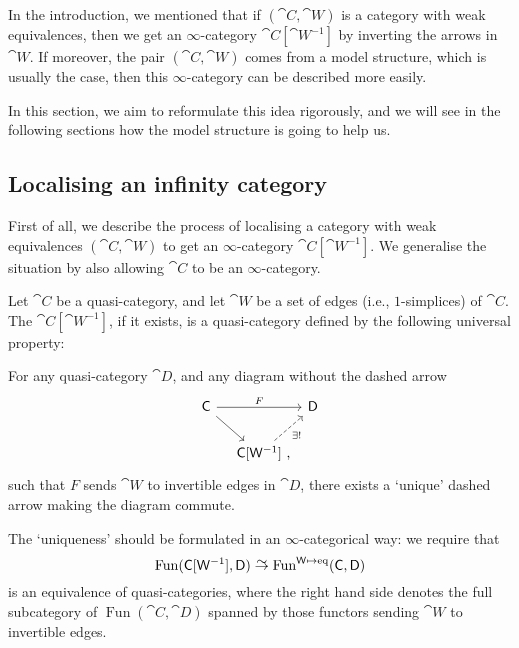 In the introduction, we mentioned that
if $(\cat{C},\cat{W})$ is a category with weak equivalences,
then we get an $\infty$-category $\cat{C}[\cat{W}^{-1}]$
by inverting the arrows in $\cat{W}$.
If moreover, the pair $(\cat{C},\cat{W})$ comes from a model structure,
which is usually the case,
then this $\infty$-category can be described more easily.

In this section, we aim to reformulate this idea rigorously,
and we will see in the following sections
how the model structure is going to help us.

\subsection{Localising an infinity category}

First of all, we describe the process of localising
a category with weak equivalences $(\cat{C},\cat{W})$
to get an $\infty$-category $\cat{C}[\cat{W}^{-1}]$.
We generalise the situation by also allowing $\cat{C}$ to be an $\infty$-category.

\begin{definition}
    Let $\cat{C}$ be a quasi-category,
    and let $\cat{W}$ be a set of edges (i.e., $1$-simplices) of $\cat{C}$.
    The  $\cat{C}[\cat{W}^{-1}]$, if it exists,
    is a quasi-category defined by the following universal property:
    \begin{itms}
        \item For any quasi-category $\cat{D}$, and any diagram without the dashed arrow 
        \[ \begin{tikzcd} [column sep=1em]
            \cat{C} \ar[rr,"F"] \ar[dr] && \cat{D} \\
            & \cat{C}[\cat{W}^{-1}] \rlap{\ ,} \ar[ur,dashed,"\exists!"']
        \end{tikzcd} \]
        such that $F$ sends $\cat{W}$ to invertible edges in $\cat{D}$,
        there exists a `unique' dashed arrow making the diagram commute.
    \end{itms}
    The `uniqueness' should be formulated in an $\infty$-categorical way:
    we require that
    \[ \operatorname{Fun}(\cat{C}[\cat{W}^{-1}], \cat{D}) \simto
        \operatorname{Fun}^{\cat{W}\mapsto\mathrm{eq}}(\cat{C},\cat{D}) \]
    is an equivalence of quasi-categories,
    where the right hand side denotes the full subcategory of $\operatorname{Fun}(\cat{C},\cat{D})$
    spanned by those functors sending $\cat{W}$ to invertible edges.
\end{definition}

